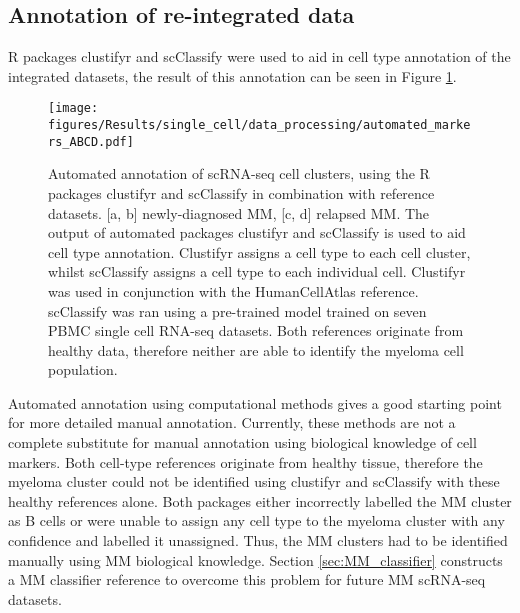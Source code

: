\subsection{Annotation of re-integrated data}\label{subsec:sc_annotate}
R packages clustifyr and scClassify were used to aid in cell type annotation of the integrated datasets, the result of this annotation can be seen in Figure \ref{fig:annotation_automated}.
\begin{figure}[htb]
    \centering
    \texttt{[image: figures/Results/single\_cell/data\_processing/automated\_markers\_ABCD.pdf]}
    \caption[Automated annotation of scRNA-seq data]{Automated annotation of scRNA-seq cell clusters, using the R packages clustifyr and scClassify in combination with reference datasets.
    [a, b] newly-diagnosed MM, [c, d] relapsed MM.
    The output of automated packages clustifyr and scClassify is used to aid cell type annotation.
    Clustifyr assigns a cell type to each cell cluster, whilst scClassify assigns a cell type to each individual cell.
    Clustifyr was used in conjunction with the HumanCellAtlas reference.
    scClassify was ran using a pre-trained model trained on seven PBMC single cell RNA-seq datasets.
    Both references originate from healthy data, therefore neither are able to identify the myeloma cell population.}
    \label{fig:annotation_automated}
\end{figure}

Automated annotation using computational methods gives a good starting point for more detailed manual annotation.
Currently, these methods are not a complete substitute for manual annotation using biological knowledge of cell markers.
Both cell-type references originate from healthy tissue, therefore the myeloma cluster could not be identified using clustifyr and scClassify with these healthy references alone.
Both packages either incorrectly labelled the MM cluster as B cells or were unable to assign any cell type to the myeloma cluster with any confidence and labelled it unassigned.
Thus, the MM clusters had to be identified manually using MM biological knowledge.
Section \ref{sec:MM_classifier} constructs a MM classifier reference to overcome this problem for future MM scRNA-seq datasets.

